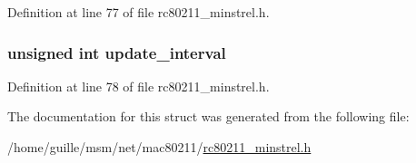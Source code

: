 Definition at line 77 of file rc80211\-\_\-minstrel.\-h.

\hypertarget{structminstrel__priv_a09d248b46f6ec43755860c9e20b8e142}{
\subsubsection[{update\-\_\-interval}]{\setlength{\rightskip}{0pt plus 5cm}unsigned int update\-\_\-interval}}\label{structminstrel__priv_a09d248b46f6ec43755860c9e20b8e142}


Definition at line 78 of file rc80211\-\_\-minstrel.\-h.



The documentation for this struct was generated from the following file\-:\begin{DoxyCompactItemize}
\item 
/home/guille/msm/net/mac80211/\hyperlink{rc80211__minstrel_8h}{rc80211\-\_\-minstrel.\-h}\end{DoxyCompactItemize}
